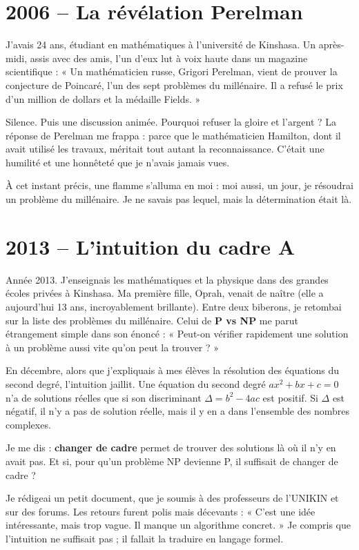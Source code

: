 \documentclass[11pt,a4paper]{article}
\begin{document}
\section{2006 – La révélation Perelman}

J'avais 24 ans, étudiant en mathématiques à l'université de Kinshasa. Un après-midi, assis avec des amis, l'un d'eux lut à voix haute dans un magazine scientifique : « Un mathématicien russe, Grigori Perelman, vient de prouver la conjecture de Poincaré, l'un des sept problèmes du millénaire. Il a refusé le prix d'un million de dollars et la médaille Fields. »

Silence. Puis une discussion animée. Pourquoi refuser la gloire et l'argent ? La réponse de Perelman me frappa : parce que le mathématicien Hamilton, dont il avait utilisé les travaux, méritait tout autant la reconnaissance. C'était une humilité et une honnêteté que je n'avais jamais vues.

À cet instant précis, une flamme s'alluma en moi : moi aussi, un jour, je résoudrai un problème du millénaire. Je ne savais pas lequel, mais la détermination était là.

\section{2013 – L'intuition du cadre A}

Année 2013. J'enseignais les mathématiques et la physique dans des grandes écoles privées à Kinshasa. Ma première fille, Oprah, venait de naître (elle a aujourd'hui 13 ans, incroyablement brillante). Entre deux biberons, je retombai sur la liste des problèmes du millénaire. Celui de \textbf{P vs NP} me parut étrangement simple dans son énoncé : « Peut-on vérifier rapidement une solution à un problème aussi vite qu'on peut la trouver ? »

En décembre, alors que j'expliquais à mes élèves la résolution des équations du second degré, l'intuition jaillit. Une équation du second degré $ax^2+bx+c=0$ n'a de solutions réelles que si son discriminant $\Delta = b^2-4ac$ est positif. Si $\Delta$ est négatif, il n'y a pas de solution réelle, mais il y en a dans l'ensemble des nombres complexes.

Je me dis : \textbf{changer de cadre} permet de trouver des solutions là où il n'y en avait pas. Et si, pour qu'un problème NP devienne P, il suffisait de changer de cadre ?

Je rédigeai un petit document, que je soumis à des professeurs de l'UNIKIN et sur des forums. Les retours furent polis mais décevants : « C'est une idée intéressante, mais trop vague. Il manque un algorithme concret. » Je compris que l'intuition ne suffisait pas ; il fallait la traduire en langage formel.
\end{document}
